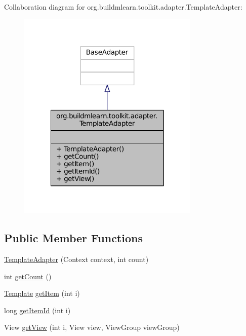 Collaboration diagram for org.\-buildmlearn.\-toolkit.\-adapter.\-Template\-Adapter\-:
\nopagebreak
\begin{figure}[H]
\begin{center}
\leavevmode
\includegraphics[width=246pt]{d0/d53/classorg_1_1buildmlearn_1_1toolkit_1_1adapter_1_1TemplateAdapter__coll__graph}
\end{center}
\end{figure}
\subsection*{Public Member Functions}
\begin{DoxyCompactItemize}
\item 
\hyperlink{classorg_1_1buildmlearn_1_1toolkit_1_1adapter_1_1TemplateAdapter_a12a3a1aa862a0430af201161d1a9228e}{Template\-Adapter} (Context context, int count)
\item 
int \hyperlink{classorg_1_1buildmlearn_1_1toolkit_1_1adapter_1_1TemplateAdapter_aca56e48f1ee0920f7fdefb5a45399ff8}{get\-Count} ()
\item 
\hyperlink{enumorg_1_1buildmlearn_1_1toolkit_1_1model_1_1Template}{Template} \hyperlink{classorg_1_1buildmlearn_1_1toolkit_1_1adapter_1_1TemplateAdapter_a0a369687833d55da928db3df41b65c39}{get\-Item} (int i)
\item 
long \hyperlink{classorg_1_1buildmlearn_1_1toolkit_1_1adapter_1_1TemplateAdapter_af7269011268e606de6d4c841d349149f}{get\-Item\-Id} (int i)
\item 
View \hyperlink{classorg_1_1buildmlearn_1_1toolkit_1_1adapter_1_1TemplateAdapter_aa56bb0fb4cc820bb38099719ee72faa6}{get\-View} (int i, View view, View\-Group view\-Group)
\end{DoxyCompactItemize}


